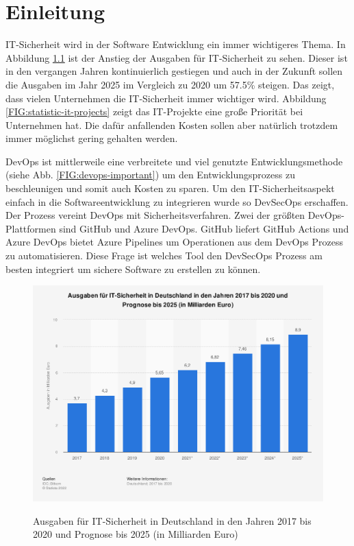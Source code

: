 \chapter{Einleitung}
IT-Sicherheit wird in der Software Entwicklung ein immer wichtigeres  Thema. In Abbildung \ref{FIG:statistic-ausgaben-it-sicherheit} ist der Anstieg der Ausgaben für IT-Sicherheit zu sehen. Dieser ist in den vergangen Jahren kontinuierlich gestiegen und auch in der Zukunft sollen die Ausgaben im Jahr 2025 im Vergleich zu 2020 um 57.5\% steigen. Das zeigt, dass vielen Unternehmen die IT-Sicherheit immer wichtiger wird. Abbildung \ref{FIG:statistic-it-projects} zeigt das IT-Projekte eine große Priorität bei Unternehmen hat. Die dafür anfallenden Kosten sollen aber natürlich trotzdem immer möglichst gering gehalten werden.

DevOps ist mittlerweile eine verbreitete und viel genutzte Entwicklungsmethode (siehe Abb. \ref{FIG:devops-important}) um den Entwicklungsprozess zu beschleunigen und somit auch Kosten zu sparen. Um den IT-Sicherheitsaspekt einfach in die Softwareentwicklung zu integrieren wurde so DevSecOps erschaffen. Der Prozess vereint DevOps mit Sicherheitsverfahren. \cite{security-model}
Zwei der größten DevOps-Plattformen sind GitHub und Azure DevOps. GitHub liefert GitHub Actions und Azure DevOps bietet Azure Pipelines um Operationen aus dem DevOps Prozess zu automatisieren. Diese Frage ist welches Tool den DevSecOps Prozess am besten integriert um sichere Software zu erstellen zu können.


\begin{figure}[H]
	{\caption{Ausgaben für IT-Sicherheit in Deutschland in den Jahren 2017 bis 2020 und Prognose bis 2025 (in Milliarden Euro)}
		\label{FIG:statistic-ausgaben-it-sicherheit}}
	{\includegraphics[width=1\textwidth]{figures/statistic-ausgaben-it-sicherheit.png}}
\end{figure}

